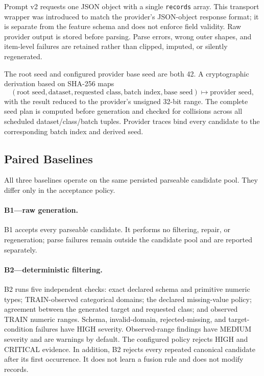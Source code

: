 Prompt v2 requests one JSON object with a single \texttt{records} array. This
transport wrapper was introduced to match the provider's JSON-object response
format; it is separate from the feature schema and does not enforce field
validity. Raw provider output is stored before parsing. Parse errors, wrong
outer shapes, and item-level failures are retained rather than clipped,
imputed, or silently regenerated.

The root seed and configured provider base seed are both 42. A cryptographic
derivation based on SHA-256 maps
\begin{equation}
  (\text{root seed},\text{dataset},\text{requested class},\text{batch index},
  \text{base seed})
  \longmapsto \text{provider seed},
  \label{eq:seed-derivation}
\end{equation}
with the result reduced to the provider's unsigned 32-bit range. The complete
seed plan is computed before generation and checked for collisions across all
scheduled dataset/class/batch tuples. Provider traces bind every candidate to
the corresponding batch index and derived seed.

\subsection{Paired Baselines}
\label{sec:baselines}

All three baselines operate on the same persisted parseable candidate pool.
They differ only in the acceptance policy.

\paragraph{B1---raw generation.}
B1 accepts every parseable candidate. It performs no filtering, repair, or
regeneration; parse failures remain outside the candidate pool and are
reported separately.

\paragraph{B2---deterministic filtering.}
B2 runs five independent checks: exact declared schema and primitive numeric
types; TRAIN-observed categorical domains; the declared missing-value policy;
agreement between the generated target and requested class; and observed TRAIN
numeric ranges. Schema, invalid-domain, rejected-missing, and target-condition
failures have HIGH severity. Observed-range findings have MEDIUM severity and
are warnings by default. The configured policy rejects HIGH and CRITICAL
evidence. In addition, B2 rejects every repeated canonical candidate after its
first occurrence. It does not learn a fusion rule and does not modify records.

